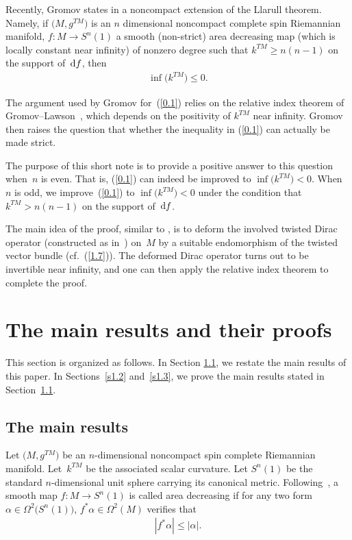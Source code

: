 \documentclass[pdftex]{sigma}
\numberwithin{equation}{section}
\theoremstyle{definition}
\begin{document}
Recently, Gromov states in \cite[p.~45]{Gr19} a noncompact extension of the Llarull theorem. Namely, if $\big(M,g^{TM}\big)$ is an $n$ dimensional noncompact complete spin Riemannian manifold, $f\colon M\rightarrow S^n(1)$ a smooth (non-strict) area decreasing map (which is locally constant near infinity) of nonzero degree such that $k^{TM}\geq n(n-1)$ on the support of~${\rm d}f$, then
\begin{gather}\label{0.1}
\inf \big(k^{TM}\big)\leq 0.
\end{gather}

The argument used by Gromov for~(\ref{0.1}) relies on the relative index theorem of Gromov--Lawson~\cite{GL83}, which depends on the positivity of $k^{TM}$ near infinity. Gromov then raises the question that whether the inequality in (\ref{0.1}) can actually be made {strict}.

The purpose of this short note is to provide a positive answer to this question when~$n$ is even. That is, (\ref{0.1}) can indeed be improved to $\inf \big(k^{TM}\big)< 0$. When $n$ is odd, we improve~(\ref{0.1}) to $\inf \big(k^{TM}\big)< 0$ under the condition that $k^{TM}> n(n-1)$ on the support of~${\rm d}f$.

The main idea of the proof, similar to \cite[equation~(1.11)]{Z19}, is to deform the involved twisted Dirac operator (constructed as in~\cite{L98})
on~$M$ by a suitable endomorphism of the twisted vector bundle (cf.~(\ref{1.7})). The deformed Dirac operator turns out to be invertible near infinity, and one can then apply the relative index theorem to complete the proof.

\section{The main results and their proofs}\label{s1}

This section is organized as follows. In Section \ref{s1.1}, we restate the main results of this paper. In Sections~\ref{s1.2} and~\ref{s1.3}, we prove the main results stated in Section~\ref{s1.1}.

\subsection{The main results}\label{s1.1}

Let $\big(M,g^{TM}\big)$ be an $n$-dimensional noncompact spin complete Riemannian manifold. Let~$k^{TM}$ be the associated scalar curvature. Let $S^n(1)$ be the standard $n$-dimensional unit sphere carrying its canonical metric. Following~\cite{GL83}, a smooth map $f\colon M \rightarrow S^n(1)$ is called area decreasing if for any two form $\alpha\in\Omega^2\big(S^n(1)\big)$, $f^*\alpha\in\Omega^2(M)$ verifies that
\begin{gather}\label{1.1}
|f^*\alpha|\leq |\alpha|.
\end{gather}
\end{document}
